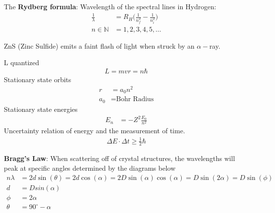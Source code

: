 \begin{multicols}{2}
The \textbf{Rydberg formula}: Wavelength of the spectral lines in Hydrogen:
\begin{align}
\frac{1}{\lambda} &=R_H \bigg(\frac{1}{n_f^2}-\frac{1}{n_i^2} \bigg) \\
n \in \mathbb{N} &= 1,2,3,4,5,\dots 
\end{align}

\begin{note}
	ZnS (Zinc Sulfide) emits a faint flash of light when struck by an $\alpha -$ray.
\end{note}
L quantized
\begin{align}
L=mvr=n\hbar
\end{align}
Stationary state orbits
\begin{align}
r &=a_0n^2 \\
a_0 &= \textrm{Bohr Radius}
\end{align}
Stationary state energies
\begin{align}
E_n &=-Z^2\frac{E_0}{n^2}
\end{align}
Uncertainty relation of energy and the measurement of time.
\begin{align}
\Delta E \cdot \Delta t \geq \frac{1}{2} \hbar
\end{align}
\end{multicols}
\textbf{Bragg's Law}: When scattering off of crystal structures, the wavelengths will peak at specific angles determined by the diagrams below
\begin{align}
n\lambda &=2d\sin(\theta)=2d\cos(\alpha) = 2D\sin(\alpha)\cos(\alpha) =D\sin(2\alpha) = D\sin(\phi)\\
d &= Dsin(\alpha) \\
\phi &= 2 \alpha \\
\theta &= 90^\circ - \alpha
\end{align} 
